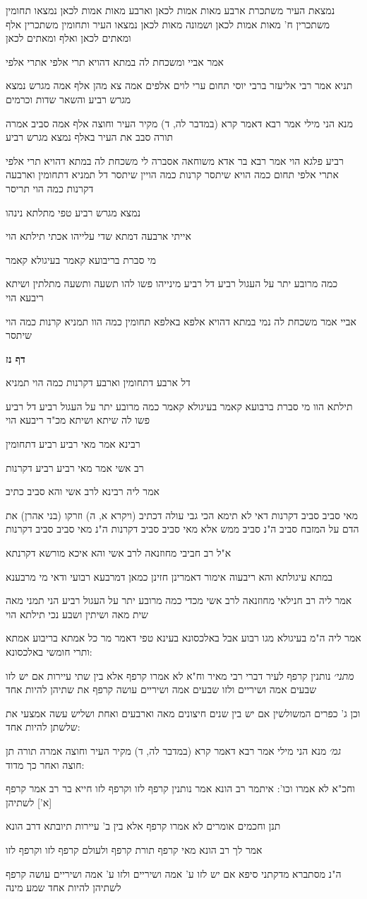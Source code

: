 \documentclass[12pt, openany]{book}
\newcommand{\sethebfont}{
\fontsize{10.5pt}{21.0pt} \selectfont
}
\newcommand{\textblock}[1]{
{\sethebfont #1\\}	
}
\newcommand{\sectname}{}
\newcommand{\newsection}[1]{
	\addcontentsline{toc}{section}{#1}
	\renewcommand{\sectname}{#1}	
	\vspace{-\baselineskip}
	\begin{center}
		\textbf{%
\fontsize{16pt}{16pt}\selectfont
			#1}
	\end{center}
	\vspace{-\baselineskip}
	\nopagebreak
}
\begin{document}
\textblock{נמצאת העיר משתכרת ארבע מאות אמות לכאן וארבע מאות אמות לכאן נמצאו תחומין משתכרין ח' מאות אמות לכאן ושמונה מאות לכאן נמצאו העיר ותחומין משתכרין אלף ומאתים לכאן ואלף ומאתים לכאן}
\textblock{אמר אביי ומשכחת לה במתא דהויא תרי אלפי אתרי אלפי}
\textblock{תניא אמר רבי אליעזר ברבי יוסי תחום ערי לוים אלפים אמה צא מהן אלף אמה מגרש נמצא מגרש רביע והשאר שדות וכרמים}
\textblock{מנא הני מילי אמר רבא דאמר קרא (במדבר לה, ד) מקיר העיר וחוצה אלף אמה סביב אמרה תורה סבב את העיר באלף נמצא מגרש רביע}
\textblock{רביע פלגא הוי אמר רבא בר אדא משוחאה אסברה לי משכחת לה במתא דהויא תרי אלפי אתרי אלפי תחום כמה הויא שיתסר קרנות כמה הויין שיתסר דל תמניא דתחומין וארבעה דקרנות כמה הוי תריסר}
\textblock{נמצא מגרש רביע טפי מתלתא נינהו}
\textblock{אייתי ארבעה דמתא שדי עלייהו אכתי תילתא הוי}
\textblock{מי סברת בריבועא קאמר בעיגולא קאמר}
\textblock{כמה מרובע יתר על העגול רביע דל רביע מינייהו פשו להו תשעה ותשעה מתלתין ושיתא ריבעא הוי}
\textblock{אביי אמר משכחת לה נמי במתא דהויא אלפא באלפא תחומין כמה הוו תמניא קרנות כמה הוי שיתסר}
\newsection{דף נז}
\textblock{דל ארבע דתחומין וארבע דקרנות כמה הוי תמניא}
\textblock{תילתא הוו מי סברת ברבועא קאמר בעיגולא קאמר כמה מרובע יתר על העגול רביע דל רביע פשו לה שיתא ושיתא מכ"ד ריבעא הוי}
\textblock{רבינא אמר מאי רביע רביע דתחומין}
\textblock{רב אשי אמר מאי רביע רביע דקרנות}
\textblock{אמר ליה רבינא לרב אשי והא סביב כתיב}
\textblock{מאי סביב סביב דקרנות דאי לא תימא הכי גבי עולה דכתיב (ויקרא א, ה) וזרקו (בני אהרן) את הדם על המזבח סביב ה"נ סביב ממש אלא מאי סביב סביב דקרנות ה"נ מאי סביב סביב דקרנות}
\textblock{א"ל רב חביבי מחוזנאה לרב אשי והא איכא מורשא דקרנתא}
\textblock{במתא עיגולתא והא ריבעוה אימור דאמרינן חזינן כמאן דמרבעא רבועי ודאי מי מרבענא}
\textblock{אמר ליה רב חנילאי מחוזנאה לרב אשי מכדי כמה מרובע יתר על העגול רביע הני תמני מאה שית מאה ושיתין ושבע נכי תילתא הוי}
\textblock{אמר ליה ה"מ בעיגולא מגו רבוע אבל באלכסונא בעינא טפי דאמר מר כל אמתא בריבוע אמתא ותרי חומשי באלכסונא:}
\textblock{{\large\emph{מתני׳}} נותנין קרפף לעיר דברי רבי מאיר וח"א לא אמרו קרפף אלא בין שתי עיירות אם יש לזו שבעים אמה ושיריים ולזו שבעים אמה ושיריים עושה קרפף את שתיהן להיות אחד}
\textblock{וכן ג' כפרים המשולשין אם יש בין שנים חיצונים מאה וארבעים ואחת ושליש עשה אמצעי את שלשתן להיות אחד:}
\textblock{{\large\emph{גמ׳}} מנא הני מילי אמר רבא דאמר קרא (במדבר לה, ד) מקיר העיר וחוצה אמרה תורה תן חוצה ואחר כך מדוד:}
\textblock{וחכ"א לא אמרו וכו': איתמר רב הונא אמר נותנין קרפף לזו וקרפף לזו חייא בר רב אמר קרפף [א'] לשתיהן}
\textblock{תנן וחכמים אומרים לא אמרו קרפף אלא בין ב' עיירות תיובתא דרב הונא}
\textblock{אמר לך רב הונא מאי קרפף תורת קרפף ולעולם קרפף לזו וקרפף לזו}
\textblock{ה"נ מסתברא מדקתני סיפא אם יש לזו ע' אמה ושיריים ולזו ע' אמה ושיריים עושה קרפף לשתיהן להיות אחד שמע מינה}
\end{document}
